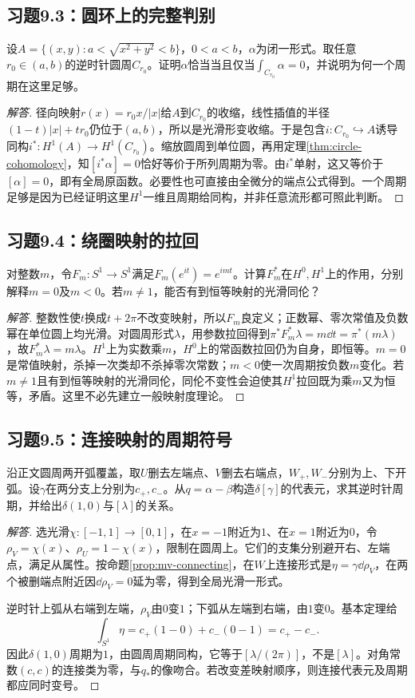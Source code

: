 \subsection*{习题9.3：圆环上的完整判别}
设$A=\{(x,y):a<\sqrt{x^2+y^2}<b\}$，$0<a<b$，$\alpha$为闭一形式。取任意$r_0\in(a,b)$的逆时针圆周$C_{r_0}$。证明$\alpha$恰当当且仅当$\int_{C_{r_0}}\alpha=0$，并说明为何一个周期在这里足够。
\begin{proof}[解答]
径向映射$r(x)=r_0x/|x|$给$A$到$C_{r_0}$的收缩，线性插值的半径$(1-t)|x|+tr_0$仍位于$(a,b)$，所以是光滑形变收缩。于是包含$i:C_{r_0}\hookrightarrow A$诱导同构$i^*:H^1(A)\to H^1(C_{r_0})$。缩放圆周到单位圆，再用定理\ref{thm:circle-cohomology}，知$[i^*\alpha]=0$恰好等价于所列周期为零。由$i^*$单射，这又等价于$[\alpha]=0$，即有全局原函数。必要性也可直接由全微分的端点公式得到。一个周期足够是因为已经证明这里$H^1$一维且周期给同构，并非任意流形都可照此判断。
\end{proof}

\subsection*{习题9.4：绕圈映射的拉回}
对整数$m$，令$F_m:S^1\to S^1$满足$F_m(e^{it})=e^{imt}$。计算$F_m^*$在$H^0,H^1$上的作用，分别解释$m=0$及$m<0$。若$m\ne1$，能否有到恒等映射的光滑同伦？
\begin{proof}[解答]
整数性使$t$换成$t+2\pi$不改变映射，所以$F_m$良定义；正数幂、零次常值及负数幂在单位圆上均光滑。对圆周形式$\lambda$，用参数拉回得到$\pi^*F_m^*\lambda=m\dd t=\pi^*(m\lambda)$，故$F_m^*\lambda=m\lambda$。$H^1$上为实数乘$m$，$H^0$上的常函数拉回仍为自身，即恒等。$m=0$是常值映射，杀掉一次类却不杀掉零次常数；$m<0$使一次周期按负数$m$变化。若$m\ne1$且有到恒等映射的光滑同伦，同伦不变性会迫使其$H^1$拉回既为乘$m$又为恒等，矛盾。这里不必先建立一般映射度理论。
\end{proof}

\subsection*{习题9.5：连接映射的周期符号}
沿正文圆周两开弧覆盖，取$U$删去左端点、$V$删去右端点，$W_+,W_-$分别为上、下开弧。设$\gamma$在两分支上分别为$c_+,c_-$。从$q=\alpha-\beta$构造$\delta[\gamma]$的代表元，求其逆时针周期，并给出$\delta(1,0)$与$[\lambda]$的关系。
\begin{proof}[解答]
选光滑$\chi:[-1,1]\to[0,1]$，在$x=-1$附近为$1$、在$x=1$附近为$0$，令$\rho_V=\chi(x)$、$\rho_U=1-\chi(x)$，限制在圆周上。它们的支集分别避开右、左端点，满足从属性。按命题\ref{prop:mv-connecting}，在$W$上连接形式是$\eta=\gamma\dd\rho_V$，在两个被删端点附近因$\dd\rho_V=0$延为零，得到全局光滑一形式。

逆时针上弧从右端到左端，$\rho_V$由$0$变$1$；下弧从左端到右端，由$1$变$0$。基本定理给
\[
 \int_{S^1}\eta=c_+(1-0)+c_-(0-1)=c_+-c_-.
\]
因此$\delta(1,0)$周期为$1$，由圆周周期同构，它等于$[\lambda/(2\pi)]$，不是$[\lambda]$。对角常数$(c,c)$的连接类为零，与$q_*$的像吻合。若改变差映射顺序，则连接代表元及周期都应同时变号。
\end{proof}

